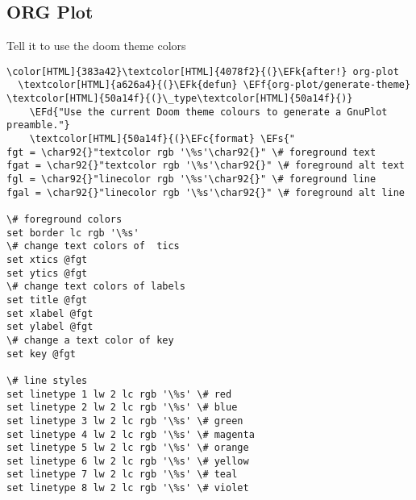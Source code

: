 \documentclass{scrartcl}
\newcommand{\EFk}[1]{\textcolor{EFk}{#1}} %
\newcommand{\EFd}[1]{\textcolor{EFd}{\textit{#1}}} %
\newcommand{\EFs}[1]{\textcolor{EFs}{#1}} %
\newcommand{\EFc}[1]{\textcolor{EFc}{#1}} %
\newcommand{\EFf}[1]{\textcolor{EFf}{#1}} %
\begin{document}
\subsection{ORG Plot}
\label{sec:org975fffd}
Tell it to use the doom theme colors
\begin{Code}
\begin{Verbatim}[]
\color[HTML]{383a42}\textcolor[HTML]{4078f2}{(}\EFk{after!} org-plot
  \textcolor[HTML]{a626a4}{(}\EFk{defun} \EFf{org-plot/generate-theme} \textcolor[HTML]{50a14f}{(}\_type\textcolor[HTML]{50a14f}{)}
    \EFd{"Use the current Doom theme colours to generate a GnuPlot preamble."}
    \textcolor[HTML]{50a14f}{(}\EFc{format} \EFs{"
fgt = \char92{}"textcolor rgb '\%s'\char92{}" \# foreground text
fgat = \char92{}"textcolor rgb '\%s'\char92{}" \# foreground alt text
fgl = \char92{}"linecolor rgb '\%s'\char92{}" \# foreground line
fgal = \char92{}"linecolor rgb '\%s'\char92{}" \# foreground alt line

\# foreground colors
set border lc rgb '\%s'
\# change text colors of  tics
set xtics @fgt
set ytics @fgt
\# change text colors of labels
set title @fgt
set xlabel @fgt
set ylabel @fgt
\# change a text color of key
set key @fgt

\# line styles
set linetype 1 lw 2 lc rgb '\%s' \# red
set linetype 2 lw 2 lc rgb '\%s' \# blue
set linetype 3 lw 2 lc rgb '\%s' \# green
set linetype 4 lw 2 lc rgb '\%s' \# magenta
set linetype 5 lw 2 lc rgb '\%s' \# orange
set linetype 6 lw 2 lc rgb '\%s' \# yellow
set linetype 7 lw 2 lc rgb '\%s' \# teal
set linetype 8 lw 2 lc rgb '\%s' \# violet


\end{Verbatim}
\end{Code}
\end{document}
